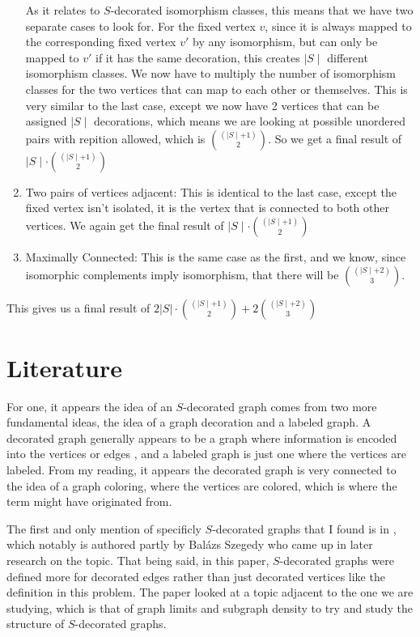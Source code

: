 \documentclass[11pt,reqno]{amsart}
\theoremstyle{definition}
\begin{document}
\begin{enumerate}
    As it relates to $S$-decorated isomorphism classes, this means that we have two separate cases to look for. For the fixed vertex $v$, since it is always mapped to the corresponding fixed vertex $v'$ by any isomorphism, but can only be mapped to $v'$ if it has the same decoration, this creates $\mid S \mid$ different isomorphism classes. We now have to multiply the number of isomorphism classes for the two vertices that can map to each other or themselves. This is very similar to the last case, except we now have 2 vertices that can be assigned $\mid S \mid$ decorations, which means we are looking at possible unordered pairs with repition allowed, which is $(\mid S \mid + 1) \choose 2$. So we get a final result of $\mid S \mid \cdot \binom{(\mid S \mid + 1)}{2}$
    \item Two pairs of vertices adjacent: This is identical to the last case, except the fixed vertex isn't isolated, it is the vertex that is connected to both other vertices. We again get the final result of $\mid S \mid \cdot \binom{(\mid S \mid + 1)}{2}$
    \item Maximally Connected: This is the same case as the first, and we know, since isomorphic complements imply isomorphism, that there will be $(\mid S \mid + 2) \choose 3$. 
\end{enumerate}

This gives us a final result of $2|S| \cdot \binom{(\mid S \mid + 1)}{2} + 2\binom{(\mid S \mid + 2)}{3}$



\section{Literature}
\label{sec:Literature}

For one, it appears the idea of an $S$-decorated graph comes from two more fundamental ideas, the idea of a graph decoration and a labeled graph. A decorated graph generally appears to be a graph where information is encoded into the vertices or edges \cite{lovasz2010limits}, and a labeled graph is just one where the vertices are labeled. From my reading, it appears the decorated graph is very connected to the idea of a graph coloring, where the vertices are colored, which is where the term might have originated from.

The first and only mention of specificly $S$-decorated graphs that I found is in \cite{lovasz2010limits}, which notably is authored partly by Balázs Szegedy who came up in later research on the topic. That being said, in this paper, $S$-decorated graphs were defined more for decorated edges rather than just decorated vertices like the definition in this problem. The paper looked at a topic adjacent to the one we are studying, which is that of graph limits and subgraph density to try and study the structure of $S$-decorated graphs. 
\end{document}
